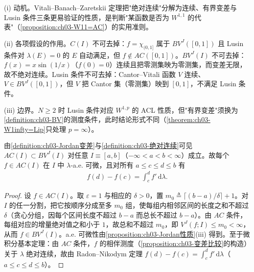 \documentclass[../../main.tex]{subfiles}%
\begin{document}
\begin{remark}\label{remark:ch03-VBZ动机}
(i) 动机。Vitali--Banach--Zaretskii 定理把"绝对连续"分解为连续、有界变差与 Lusin 条件三条更易验证的性质，是判断"某函数是否为 $W^{1,1}$ 的代表"（\cref{proposition:ch03-W11=AC}）的实用准则。

(ii) 各项假设的作用。$C(I)$ 不可去掉：$f=\chi_{(0,1]}$ 属于 $BV^J([0,1])$ 且 Lusin 条件对 $\lambda(E)=0$ 的 $E$ 自动满足，但 $f\notin AC([0,1])$。$BV^J(I)$ 不可去掉：$f(x)=x\sin(1/x)$（$f(0)=0$）连续且把零测集映为零测集，而变差无限，故不绝对连续。Lusin 条件不可去掉：Cantor--Vitali 函数 $V$ 连续、$V\in BV^J([0,1])$，但 $V$ 把 Cantor 集（零测集）映到 $[0,1]$，不满足 Lusin 条件。

(iii) 边界。$N\geqslant2$ 时 Lusin 条件对应 $W^{1,p}$ 的 ACL 性质，但"有界变差"须换为\cref{definition:ch03-BV}的测度条件，此时结论形式不同（\cref{theorem:ch03-W1infty=Lip}只处理 $p=\infty$）。
\end{remark}

\begin{remark}\label{remark:ch03-AC蕴含}
由\cref{definition:ch03-Jordan变差}与\cref{definition:ch03-绝对连续}可见 $AC(I)\subset BV^J(I)$ 对任意 $I\equiv[a,b]$（$-\infty<a<b<\infty$）成立。故每个 $f\in AC(I)$ 在 $I$ 中 $\lambda$-a.e. 可微，且对所有 $a\leqslant c\leqslant d\leqslant b$ 有
\begin{align*}
f(d)-f(c)=\int_c^df'\,\mathrm{d}\lambda.
\end{align*}
\end{remark}

\begin{proof}
设 $f\in AC(I)$。取 $\varepsilon=1$ 与相应的 $\delta>0$，置 $m_0\triangleq\lceil(b-a)/\delta\rceil+1$。对 $I$ 的任一分割，把它按顺序分成至多 $m_0$ 组，使每组内相邻区间的长度之和不超过 $\delta$（贪心分组，因每个区间长度不超过 $b-a$ 而总长不超过 $b-a$）。由 $AC$ 条件，每组对应的增量绝对值之和小于 $1$，故总和不超过 $m_0$，即 $V^J(f;I)\leqslant m_0<\infty$，从而 $f\in BV^J(I)$。a.e. 可微性由\cref{proposition:ch03-Jordan性质}(iii) 得到。至于微积分基本定理：由 $AC$ 条件，$f$ 的相伴测度（\cref{proposition:ch03-变差比较}的构造）关于 $\lambda$ 绝对连续，故由 Radon--Nikodym 定理 $f(d)-f(c)=\int_c^df'\,\mathrm{d}\lambda$（$a\leqslant c\leqslant d\leqslant b$）。
\end{proof}
\end{document}
